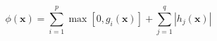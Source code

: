 
\begin{equation}
\phi (\mathbf{x})=\sum_{i=1}^{p} \max \left[0, g_{i}(\mathbf{x})\right]+\sum_{j=1}^{q}\left|h_{j}(\mathbf{x})\right|
\end{equation}